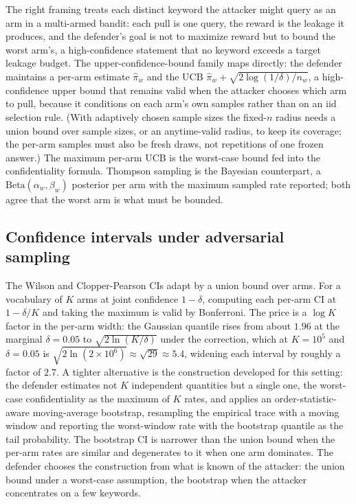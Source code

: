 The right framing treats each distinct keyword the attacker might query as
an arm in a multi-armed bandit: each pull is one query, the reward is the
leakage it produces, and the defender's goal is not to maximize reward but
to bound the worst arm's, a high-confidence statement that no keyword
exceeds a target leakage budget. The upper-confidence-bound family maps
directly: the defender maintains a per-arm estimate $\hat\pi_w$ and the UCB
$\hat\pi_w + \sqrt{2\log(1/\delta)/n_w}$, a high-confidence upper bound
that remains valid when the attacker chooses which arm to pull, because
it conditions on each arm's own samples rather than on an iid selection
rule. (With adaptively chosen sample sizes the fixed-$n$ radius needs a
union bound over sample sizes, or an anytime-valid radius, to keep its
coverage; the per-arm samples must also be fresh draws, not repetitions
of one frozen answer.) The
maximum per-arm UCB is the worst-case bound fed into the confidentiality
formula. Thompson sampling is the Bayesian counterpart, a
$\mathrm{Beta}(\alpha_w, \beta_w)$ posterior per arm with the maximum
sampled rate reported; both agree that the worst arm is what must be
bounded.

\subsection*{Confidence intervals under adversarial sampling}

The Wilson and Clopper-Pearson CIs adapt by a union bound over arms. For a
vocabulary of $K$ arms at joint confidence $1 - \delta$, computing each
per-arm CI at $1 - \delta/K$ and taking the maximum is valid by
Bonferroni. The price is a $\log K$ factor in the per-arm width: the
Gaussian quantile rises from about $1.96$ at the marginal $\delta = 0.05$
to $\sqrt{2 \ln(K/\delta)}$ under the correction, which at $K = 10^5$ and
$\delta = 0.05$ is $\sqrt{2 \ln(2 \times 10^6)} \approx \sqrt{29} \approx
5.4$, widening each interval by roughly a factor of $2.7$. A tighter
alternative is the construction \textcite{towell-es-conf-mab} developed
for this setting: the defender estimates not $K$ independent quantities
but a single one, the worst-case confidentiality as the maximum of $K$
rates, and applies an order-statistic-aware moving-average bootstrap,
resampling the empirical trace with a moving window and reporting the
worst-window rate with the bootstrap quantile as the tail probability. The
bootstrap CI is narrower than the union bound when the per-arm rates are
similar and degenerates to it when one arm dominates. The defender chooses
the construction from what is known of the attacker: the union bound under
a worst-case assumption, the bootstrap when the attacker concentrates on a
few keywords.

